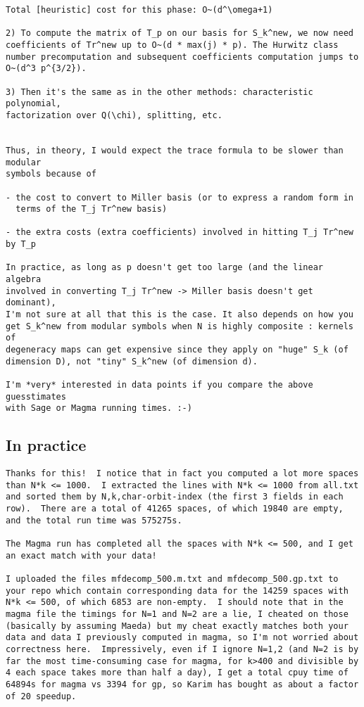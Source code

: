 \documentclass[11pt]{amsart}
\numberwithin{equation}{subsection}
\theoremstyle{definition}
\begin{document}
\begin{verbatim}
Total [heuristic] cost for this phase: O~(d^\omega+1)

2) To compute the matrix of T_p on our basis for S_k^new, we now need
coefficients of Tr^new up to O~(d * max(j) * p). The Hurwitz class
number precomputation and subsequent coefficients computation jumps to
O~(d^3 p^{3/2}).

3) Then it's the same as in the other methods: characteristic polynomial,
factorization over Q(\chi), splitting, etc.


Thus, in theory, I would expect the trace formula to be slower than modular
symbols because of

- the cost to convert to Miller basis (or to express a random form in
  terms of the T_j Tr^new basis)

- the extra costs (extra coefficients) involved in hitting T_j Tr^new by T_p

In practice, as long as p doesn't get too large (and the linear algebra
involved in converting T_j Tr^new -> Miller basis doesn't get dominant),
I'm not sure at all that this is the case. It also depends on how you
get S_k^new from modular symbols when N is highly composite : kernels of
degeneracy maps can get expensive since they apply on "huge" S_k (of
dimension D), not "tiny" S_k^new (of dimension d).

I'm *very* interested in data points if you compare the above guesstimates
with Sage or Magma running times. :-)
\end{verbatim}

\subsection{In practice}

\begin{verbatim}
Thanks for this!  I notice that in fact you computed a lot more spaces than N*k <= 1000.  I extracted the lines with N*k <= 1000 from all.txt and sorted them by N,k,char-orbit-index (the first 3 fields in each row).  There are a total of 41265 spaces, of which 19840 are empty, and the total run time was 575275s.

The Magma run has completed all the spaces with N*k <= 500, and I get an exact match with your data!

I uploaded the files mfdecomp_500.m.txt and mfdecomp_500.gp.txt to your repo which contain corresponding data for the 14259 spaces with N*k <= 500, of which 6853 are non-empty.  I should note that in the magma file the timings for N=1 and N=2 are a lie, I cheated on those (basically by assuming Maeda) but my cheat exactly matches both your data and data I previously computed in magma, so I'm not worried about correctness here.  Impressively, even if I ignore N=1,2 (and N=2 is by far the most time-consuming case for magma, for k>400 and divisible by 4 each space takes more than half a day), I get a total cpuy time of 64894s for magma vs 3394 for gp, so Karim has bought as about a factor of 20 speedup.
\end{verbatim}
\end{document}
